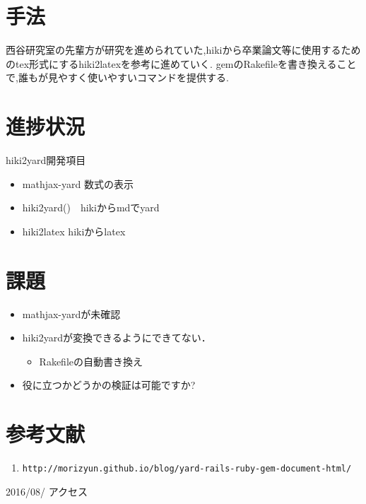 \documentclass[10pt,a4j,twocolumn]{jsarticle}
\begin{document}
\section{手法}
西谷研究室の先輩方が研究を進められていた,hikiから卒業論文等に使用するためのtex形式にするhiki2latexを参考に進めていく.
gemのRakefileを書き換えることで,誰もが見やすく使いやすいコマンドを提供する.

\section{進捗状況}
hiki2yard開発項目
\begin{itemize}
\item mathjax-yard 数式の表示
\item hiki2yard()　hikiからmdでyard
\item hiki2latex hikiからlatex
\end{itemize}
\section{課題}\begin{itemize}
\item mathjax-yardが未確認
\item hiki2yardが変換できるようにできてない．\begin{itemize}
\item Rakefileの自動書き換え
\end{itemize}
\end{itemize}\begin{itemize}
\item 役に立つかどうかの検証は可能ですか?
\end{itemize}
\section{参考文献}\begin{enumerate}
\item \verb|http://morizyun.github.io/blog/yard-rails-ruby-gem-document-html/|
\end{enumerate}
2016/08/  アクセス
\end{document}
